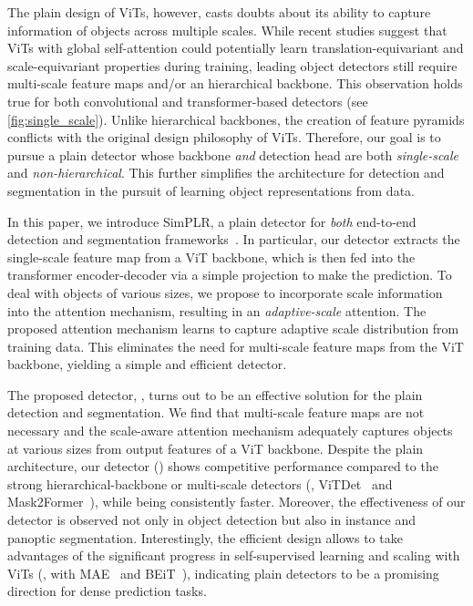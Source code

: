 The plain design of ViTs, however, casts doubts about its ability to capture information of objects across multiple scales. While recent studies \citep{dosovitskiy2021vit,li2022vitdet} suggest that ViTs with global self-attention could potentially learn translation-equivariant and scale-equivariant properties during training, leading object detectors still require multi-scale feature maps and/or an hierarchical backbone. This observation holds true for both convolutional \citep{ren2015faster_rcnn,he2017maskrcnn,li2022vitdet} and transformer-based detectors \citep{zhu2021deformable,nguyen2022boxer,cheng2022mask2former} (see \cref{fig:single_scale}). Unlike hierarchical backbones, the creation of feature pyramids conflicts with the original design philosophy of ViTs. Therefore, our goal is to pursue a plain detector whose backbone \textit{and} detection head are both \textit{single-scale} and \textit{non-hierarchical}. This further simplifies the architecture for detection and segmentation in the pursuit of learning object representations from data.

In this paper, we introduce SimPLR, a plain detector for \textit{both} end-to-end detection and segmentation frameworks~\cite{nicolas2020detr,zhu2021deformable,nguyen2022boxer,cheng2022mask2former}. In particular, our detector extracts the single-scale feature map from a ViT backbone, which is then fed into the transformer encoder-decoder via a simple projection to make the prediction. To deal with objects of various sizes, we propose to incorporate scale information into the attention mechanism, resulting in an \emph{adaptive-scale} attention. The proposed attention mechanism learns to capture adaptive scale distribution from training data. This eliminates the need for multi-scale feature maps from the ViT backbone, yielding a simple and efficient detector.

The proposed detector, \ours, turns out to be an effective solution for the plain detection and segmentation. We find that multi-scale feature maps are not necessary and the scale-aware attention mechanism adequately captures objects at various sizes from output features of a ViT backbone. Despite the plain architecture, our detector (\ours) shows competitive performance compared to the strong hierarchical-backbone or multi-scale detectors (\eg, ViTDet~\cite{li2022vitdet} and Mask2Former~\cite{cheng2022mask2former}), while being consistently faster. Moreover, the effectiveness of our detector is observed not only in object detection but also in instance and panoptic segmentation. Interestingly, the efficient design allows \ours to take advantages of the significant progress in self-supervised learning and scaling with ViTs (\eg, with MAE~\cite{he2022mae} and BEiT~\cite{peng2022beitv2}), indicating plain detectors to be a promising direction for dense prediction tasks.